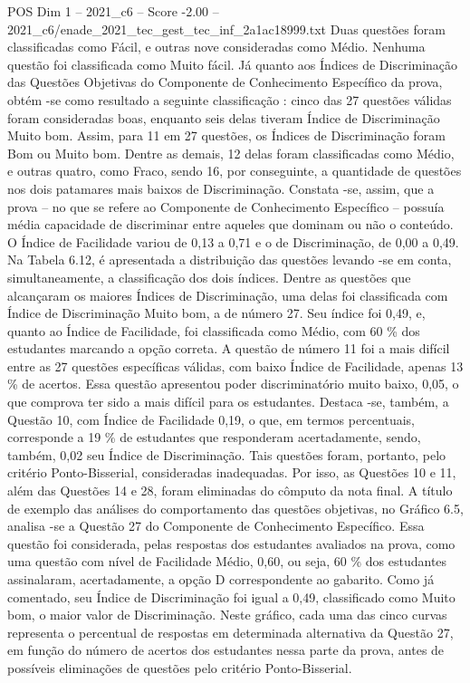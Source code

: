 \begin{textsample}{POS Dim 1 – 2021\_c6 – Score -2.00 – 2021\_c6/enade\_2021\_tec\_gest\_tec\_inf\_2a1ac18999.txt}
Duas questões foram classificadas como Fácil, e outras nove consideradas como Médio.
Nenhuma questão foi classificada como Muito fácil.
Já quanto aos Índices de Discriminação das Questões Objetivas do Componente de Conhecimento Específico da prova, obtém -se como resultado a seguinte classificação : cinco das 27 questões válidas foram consideradas boas, enquanto seis delas tiveram Índice de Discriminação Muito bom.
Assim, para 11 em 27 questões, os Índices de Discriminação foram Bom ou Muito bom.
Dentre as demais, 12 delas foram classificadas como Médio, e outras quatro, como Fraco, sendo 16, por conseguinte, a quantidade de questões nos dois patamares mais baixos de Discriminação.
Constata -se, assim, que a prova – no que se refere ao Componente de Conhecimento Específico – possuía média capacidade de discriminar entre aqueles que dominam ou não o conteúdo.
O Índice de Facilidade variou de 0,13 a 0,71 e o de Discriminação, de 0,00 a 0,49.
Na Tabela 6.12, é apresentada a distribuição das questões levando -se em conta, simultaneamente, a classificação dos dois índices.
Dentre as questões que alcançaram os maiores Índices de Discriminação, uma delas foi classificada com Índice de Discriminação Muito bom, a de número 27.
Seu índice foi 0,49, e, quanto ao Índice de Facilidade, foi classificada como Médio, com 60 \% dos estudantes marcando a opção correta.
A questão de número 11 foi a mais difícil entre as 27 questões específicas válidas, com baixo Índice de Facilidade, apenas 13 \% de acertos.
Essa questão apresentou poder discriminatório muito baixo, 0,05, o que comprova ter sido a mais difícil para os estudantes.
Destaca -se, também, a Questão 10, com Índice de Facilidade 0,19, o que, em termos percentuais, corresponde a 19 \% de estudantes que responderam acertadamente, sendo, também, 0,02 seu Índice de Discriminação.
Tais questões foram, portanto, pelo critério Ponto-Bisserial, consideradas inadequadas.
Por isso, as Questões 10 e 11, além das Questões 14 e 28, foram eliminadas do cômputo da nota final.
A título de exemplo das análises do comportamento das questões objetivas, no Gráfico 6.5, analisa -se a Questão 27 do Componente de Conhecimento Específico.
Essa questão foi considerada, pelas respostas dos estudantes avaliados na prova, como uma questão com nível de Facilidade Médio, 0,60, ou seja, 60 \% dos estudantes assinalaram, acertadamente, a opção D correspondente ao gabarito.
Como já comentado, seu Índice de Discriminação foi igual a 0,49, classificado como Muito bom, o maior valor de Discriminação.
Neste gráfico, cada uma das cinco curvas representa o percentual de respostas em determinada alternativa da Questão 27, em função do número de acertos dos estudantes nessa parte da prova, antes de possíveis eliminações de questões pelo critério Ponto-Bisserial.

\end{textsample}
